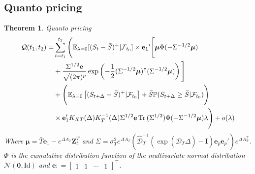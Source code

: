 \documentclass[10pt,a4paper,reqno]{amsart}
\newtheorem{theorem}{Theorem}[section]
\theoremstyle{example}
\DeclareMathOperator\Tr{Tr}
\newcommand{\Id}{\mathrm{Id}}
\newcommand{\opI}{\mathbf{I}}
\begin{document}
\subsection{Quanto pricing}
\begin{theorem} Quanto pricing
    \begin{align}
        \mathcal{Q}(t_1,t_2)=&\sum_{t=t_1}^{t_2}\Bigg( \mathbb{E}_{\lambda=0}[(S_t-\Bar{S})^+|\mathcal{F}_{t_0}]\times\mathbf{e_1}'\Bigg[\boldsymbol{\mu}\Phi(-\Sigma^{-1/2}\boldsymbol{\mu}) \nonumber\\
        &+ \frac{\Sigma^{1/2}\mathbf{e}}{\sqrt{(2\pi)^p}}\exp\left(-\frac{1}{2}(\Sigma^{-1/2}\boldsymbol{\mu})^\intercal(\Sigma^{-1/2}\boldsymbol{\mu})\right)\Bigg]\nonumber\\
        &+\Bigg(\mathbb{E}_{\lambda=0}\left[(S_{t+\Delta}-\Bar{S})^+|\mathcal{F}_{t_0}\right]+\Bar{S}\mathbb{P}(S_{t+\Delta}\geq\Bar{S}|\mathcal{F}_{t_0})\Bigg)\nonumber\\
        &\times\mathbf{e}_1'K_{XT}(\Delta)K_T^{-1}(\Delta)\Sigma^{1/2}\mathbf{e}\Tr{(\Sigma^{1/2})}\Phi(-\Sigma^{-1/2}\boldsymbol{\mu})\lambda\Bigg)+o(\lambda)\nonumber
    \end{align}
    Where $\boldsymbol\mu=\bar{T}\textbf{e}_1-e^{\Delta A_T}\textbf{Z}_t^T$ and $\Sigma = \sigma_T^2e^{\Delta A_T}\left(\hat{\mathcal{D}}_{T}^{-1}\left(\exp(\hat{\mathcal{D}}_{T}\Delta)-\opI\right)\textbf{e}_p \textbf{e}_p'
    \right)e^{\Delta A_T^\intercal}$. $\Phi$ is the cumulative distribution function of the multivariate normal distribution $\mathcal{N}(\textbf{0},\Id)$ and $\mathbf{e}: = \begin{bmatrix} 1 & 1 & \cdots & 1 \end{bmatrix}^\intercal$.
\end{theorem}
\noindent
\end{document}
